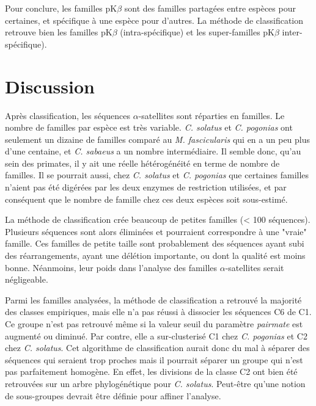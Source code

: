 \documentclass[12pt,a4paper]{article}
\begin{document}
	Pour conclure, les familles pK$\beta$ sont des familles partagées entre espèces pour certaines, et spécifique à une espèce pour d'autres. La méthode de classification retrouve bien les familles pK$\beta$ (intra-spécifique) et les super-familles pK$\beta$ inter-spécifique).

\section{Discussion}

	Après classification, les séquences $\alpha$-satellites sont réparties en familles. Le nombre de familles par espèce est très variable. \textit{C. solatus} et \textit{C. pogonias} ont seulement un dizaine de familles comparé au \textit{M. fascicularis} qui en a un peu plus d'une centaine, et \textit{C. sabaeus} a un nombre intermédiaire. Il semble donc, qu'au sein des primates, il y ait une réelle hétérogénéité en terme de nombre de familles. Il se pourrait aussi, chez \textit{C. solatus} et \textit{C. pogonias} que certaines familles n'aient pas été digérées par les deux enzymes de restriction utilisées, et par conséquent que le nombre de famille chez ces deux espèces soit sous-estimé. 

	La méthode de classification crée beaucoup de petites familles (< 100 séquences). Plusieurs séquences sont alors éliminées et pourraient correspondre à une "vraie"  famille. Ces familles de petite taille sont probablement des séquences ayant subi des réarrangements, ayant une délétion importante, ou dont la qualité est moins bonne. Néanmoins, leur poids dans l'analyse des familles $\alpha$-satellites serait négligeable.

	Parmi les familles analysées, la méthode de classification a retrouvé la majorité des classes empiriques, mais elle n'a pas réussi à dissocier les séquences C6 de C1. Ce groupe n'est pas retrouvé même si la valeur seuil du paramètre \textit{pairmate} est augmenté ou diminué. Par contre, elle a sur-clusterisé C1 chez \textit{C. pogonias} et C2  chez \textit{C. solatus}. Cet algorithme de classification aurait donc du mal à séparer des séquences qui seraient trop proches mais il pourrait séparer un groupe qui n'est pas parfaitement homogène. En effet, les divisions de la classe C2 ont bien été retrouvées sur un arbre phylogénétique pour \textit{C. solatus}. Peut-être qu'une notion de sous-groupes devrait être définie pour affiner l'analyse. 
\end{document}
